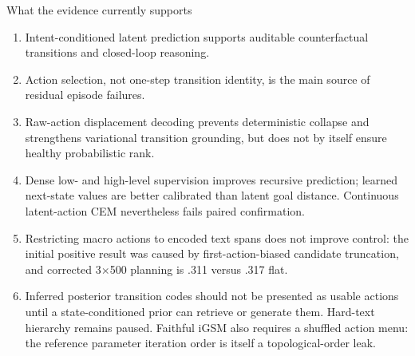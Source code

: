 \documentclass[aspectratio=169,10pt]{beamer}
\begin{document}
\begin{frame}{What the evidence currently supports}
\begin{enumerate}
\item Intent-conditioned latent prediction supports auditable
counterfactual transitions and closed-loop reasoning.
\item Action selection, not one-step transition identity, is the main source
of residual episode failures.
\item Raw-action displacement decoding prevents deterministic collapse and
strengthens variational transition grounding, but does not by itself ensure
healthy probabilistic rank.
\item Dense low- and high-level supervision improves recursive prediction;
learned next-state values are better calibrated than latent goal distance.
Continuous latent-action CEM nevertheless fails paired confirmation.
\item Restricting macro actions to encoded text spans does not improve control:
the initial positive result was caused by first-action-biased candidate
truncation, and corrected 3$\times$500 planning is .311 versus .317 flat.
\item Inferred posterior transition codes should not be presented as usable
actions until a state-conditioned prior can retrieve or generate them. Hard-text
hierarchy remains paused. Faithful iGSM also requires a shuffled action menu:
the reference parameter iteration order is itself a topological-order leak.
\end{enumerate}
\end{frame}
\end{document}
